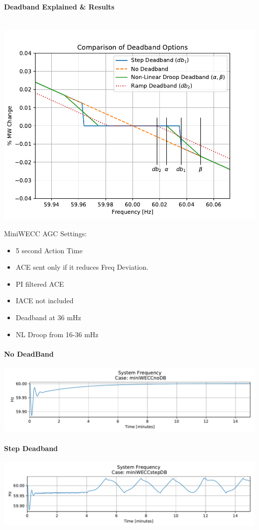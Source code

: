 \documentclass[12pt]{article}
\begin{document}
\begin{multicols}{2}
\vfill\null
\columnbreak
\paragraph{Deadband Explained \& Results} \ \\
\includegraphics[width=\linewidth]{dbAction}

MiniWECC AGC Settings:
\begin{itemize}
\item 5 second Action Time
\item ACE sent only if it reduces Freq Deviation.
\item PI filtered ACE
\item IACE not included
\item Deadband at 36 mHz
\item NL Droop from 16-36 mHz
\end{itemize}
\paragraph{No DeadBand}
\includegraphics[width=\linewidth]{noDB}
\paragraph{Step Deadband}
\includegraphics[width=\linewidth]{stepDB}

\end{multicols}
\end{document}
